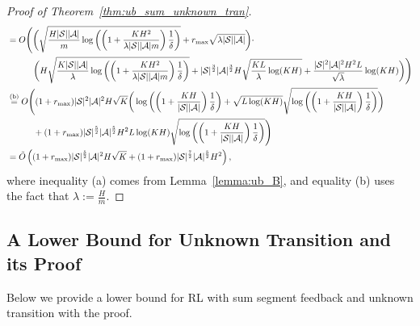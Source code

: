 \begin{proof}[Proof of Theorem~\ref{thm:ub_sum_unknown_tran}]
\begin{align*}
		&= O \Bigg( \bigg( \sqrt{ \frac{H|\mathcal{S}||\mathcal{A}|}{m} \log\left(  \left( 1+\frac{KH^2}{\lambda|\mathcal{S}||\mathcal{A}| m} \right)  \frac{1}{\delta}  \right) } + r_{\max} \sqrt{\lambda|\mathcal{S}||\mathcal{A}|}  \bigg) \cdot
		\\&\qquad\quad \bigg( H \sqrt{ \frac{K |\mathcal{S}| |\mathcal{A}|}{\lambda} \log \left(  \left( 1+ \frac{  KH^2 }{ \lambda |\mathcal{S}| |\mathcal{A}| m} \right)  \frac{1}{\delta}  \right)}   +  |\mathcal{S}|^{\frac{3}{2}} |\mathcal{A}|^{\frac{3}{2}} H  \sqrt{ \frac{K L}{\lambda} \log(KH) }  +  \frac{|\mathcal{S}|^2 |\mathcal{A}|^2 H^2 L}{\sqrt{\lambda}} \log(KH) \bigg) \Bigg)
		\\
		&\overset{\textup{(b)}}{=}  O \Bigg( (1+r_{\max}) |\mathcal{S}|^2 |\mathcal{A}|^2 H \sqrt{ K}  \bigg( \log \left(  \left(  1+ \frac{  KH }{  |\mathcal{S}| |\mathcal{A}| }  \right)  \frac{1}{\delta}  \right) 
	+ \sqrt{L \log(KH)} \sqrt{\log\left(  \left( 1+\frac{KH}{|\mathcal{S}||\mathcal{A}|} \right)  \frac{1}{\delta}  \right)} \bigg)  
		\\
		&\qquad\quad +  (1+r_{\max}) |\mathcal{S}|^{\frac{5}{2}} |\mathcal{A}|^{\frac{5}{2}} H^2 L \log(KH) \sqrt{\log\left(  \left( 1+\frac{KH}{|\mathcal{S}||\mathcal{A}|} \right) \frac{1}{\delta}  \right)}  \Bigg)
		\\
		&= \tilde{O} \left(  (1+r_{\max}) |\mathcal{S}|^{\frac{5}{2}} |\mathcal{A}|^2 H \sqrt{K} + (1+r_{\max}) |\mathcal{S}|^{\frac{7}{2}} |\mathcal{A}|^{\frac{5}{2}} H^2  \right) ,
	\end{align*}
	where inequality (a) comes from Lemma~\ref{lemma:ub_B}, and equality (b) uses the fact that $\lambda:=\frac{H}{m}$. 
\end{proof}

\subsection{A Lower Bound for Unknown Transition and its Proof} \label{apx:lb_sum_unknown_tran}

Below we provide a lower bound for RL with sum segment feedback and unknown transition with the proof.



